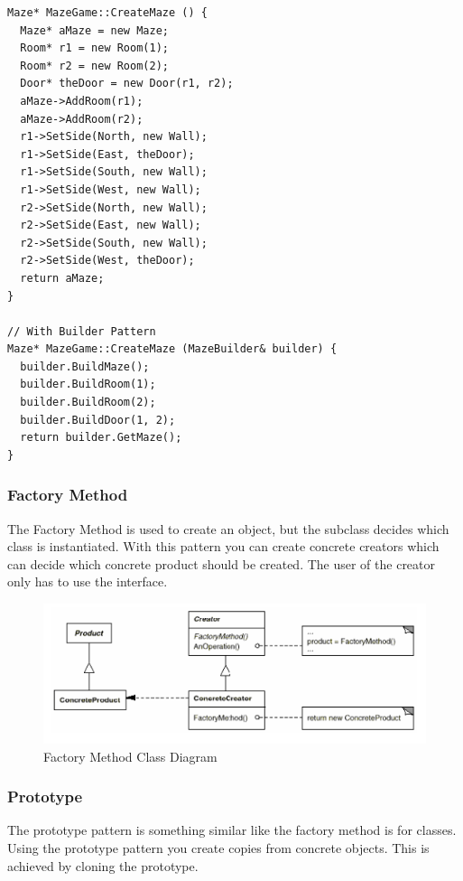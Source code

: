 \documentclass[11pt]{article}
\begin{document}
\begin{lstlisting}
Maze* MazeGame::CreateMaze () {
  Maze* aMaze = new Maze;
  Room* r1 = new Room(1);
  Room* r2 = new Room(2);
  Door* theDoor = new Door(r1, r2);
  aMaze->AddRoom(r1);
  aMaze->AddRoom(r2);
  r1->SetSide(North, new Wall);
  r1->SetSide(East, theDoor);
  r1->SetSide(South, new Wall);
  r1->SetSide(West, new Wall);
  r2->SetSide(North, new Wall);
  r2->SetSide(East, new Wall);
  r2->SetSide(South, new Wall);
  r2->SetSide(West, theDoor);
  return aMaze;
}

// With Builder Pattern
Maze* MazeGame::CreateMaze (MazeBuilder& builder) {
  builder.BuildMaze();
  builder.BuildRoom(1);
  builder.BuildRoom(2);
  builder.BuildDoor(1, 2);
  return builder.GetMaze();
}
\end{lstlisting}
\subsubsection{Factory Method}
\label{sec:org41deb84}
The Factory Method is used to create an object, but the subclass decides which class is instantiated.
With this pattern you can create concrete creators which can decide which concrete product should be created.
The user of the creator only has to use the interface.


\begin{figure}[htbp]
\centering
\includegraphics[width=.9\linewidth]{img/factory_method.png}
\caption{\label{fig:factory-method-class-diagram}Factory Method Class Diagram}
\end{figure}

\subsubsection{Prototype}
\label{sec:orgda61ea8}
The prototype pattern is something similar like the factory method is for classes.
Using the prototype pattern you create copies from concrete objects.
This is achieved by cloning the prototype.
\end{document}
